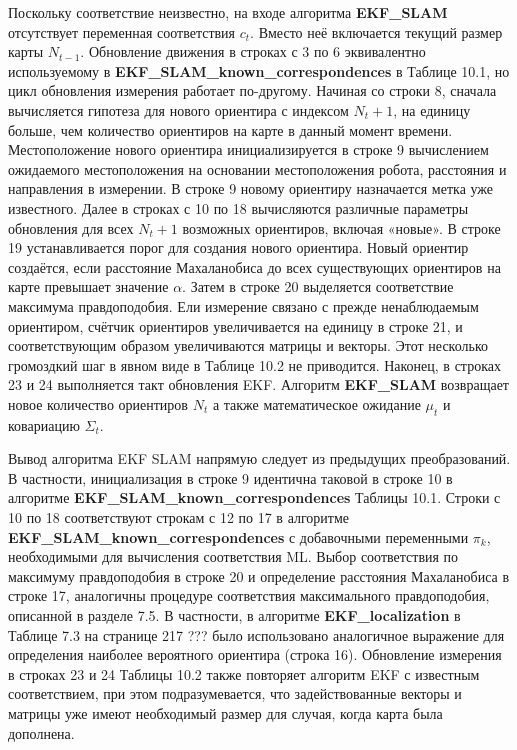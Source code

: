 \documentclass[10pt,a4paper]{article}
\begin{document}
Поскольку соответствие неизвестно, на входе алгоритма \textbf{EKF\_SLAM} отсутствует переменная соответствия $c_t$. Вместо неё включается текущий размер карты $N_{t-1}$. Обновление движения в строках с 3 по 6 эквивалентно используемому в \textbf{EKF\_SLAM\_known\_correspondences} в Таблице 10.1, но цикл обновления измерения работает по-другому. Начиная со строки 8, сначала вычисляется гипотеза для нового ориентира с индексом $N_t + 1$, на единицу больше, чем количество ориентиров на карте в данный момент времени. Местоположение нового ориентира инициализируется в строке 9 вычислением ожидаемого местоположения на основании местоположения робота, расстояния и направления в измерении. В строке 9 новому ориентиру назначается метка уже известного. Далее в строках с 10 по 18 вычисляются различные параметры обновления для всех $N_t + 1$ возможных ориентиров, включая «новые». В строке 19 устанавливается порог для создания нового ориентира. Новый ориентир создаётся, если расстояние Махаланобиса до всех существующих ориентиров на карте превышает значение $\alpha$. Затем в строке 20 выделяется соответствие максимума правдоподобия. Ели измерение связано с прежде ненаблюдаемым ориентиром, счётчик ориентиров увеличивается на единицу в строке 21, и соответствующим образом увеличиваются матрицы и векторы. Этот несколько громоздкий шаг в явном виде в Таблице 10.2 не приводится. Наконец, в строках 23 и 24 выполняется такт обновления EKF. Алгоритм \textbf{EKF\_SLAM} возвращает новое количество ориентиров $N_t$ а также математическое ожидание $\mu_t$ и ковариацию $\varSigma_t$.

Вывод алгоритма EKF SLAM напрямую следует из предыдущих преобразований. В частности, инициализация в строке 9 идентична таковой в строке 10 в алгоритме \textbf{EKF\_SLAM\_known\_correspondences} Таблицы 10.1. Строки с 10 по 18 соответствуют строкам с 12 по 17 в алгоритме \textbf{EKF\_SLAM\_known\_correspondences} с добавочными переменными $\pi_k$, необходимыми для вычисления соответствия ML. Выбор соответствия по максимуму правдоподобия в строке 20 и определение расстояния Махаланобиса в строке 17, аналогичны процедуре соответствия максимального правдоподобия, описанной в разделе 7.5. В частности, в алгоритме \textbf{EKF\_localization} в Таблице 7.3 на странице 217 ??? было использовано аналогичное выражение для определения наиболее вероятного ориентира (строка 16). Обновление измерения в строках 23 и 24 Таблицы 10.2 также повторяет алгоритм EKF с известным соответствием, при этом подразумевается, что задействованные векторы и матрицы уже имеют необходимый размер для случая, когда карта была дополнена.
\end{document}
